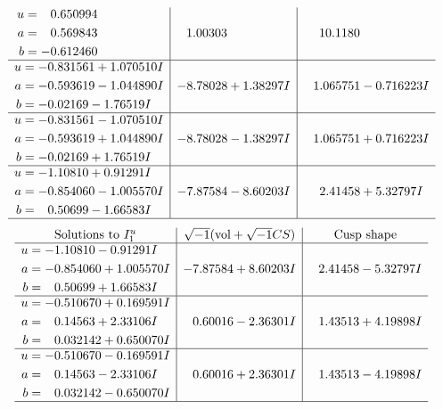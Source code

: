 \documentclass[1p]{elsarticle_modified}
\theoremstyle{definition}
\newcommand{\I}{\sqrt{-1}}
\begin{document}
$$\begin{array}{c|c|c}
\begin{aligned}
u &= \phantom{-}0.650994\phantom{ +0.000000I} \\
a &= \phantom{-}0.569843\phantom{ +0.000000I} \\
b &= -0.612460\phantom{ +0.000000I}\end{aligned}
 & \phantom{-}1.00303\phantom{ +0.000000I} & \phantom{-}10.1180\phantom{ +0.000000I} \\ \hline\begin{aligned}
u &= -0.831561 + 1.070510 I \\
a &= -0.593619 - 1.044890 I \\
b &= -0.02169 - 1.76519 I\end{aligned}
 & -8.78028 + 1.38297 I & \phantom{-}1.065751 - 0.716223 I \\ \hline\begin{aligned}
u &= -0.831561 - 1.070510 I \\
a &= -0.593619 + 1.044890 I \\
b &= -0.02169 + 1.76519 I\end{aligned}
 & -8.78028 - 1.38297 I & \phantom{-}1.065751 + 0.716223 I \\ \hline\begin{aligned}
u &= -1.10810 + 0.91291 I \\
a &= -0.854060 - 1.005570 I \\
b &= \phantom{-}0.50699 - 1.66583 I\end{aligned}
 & -7.87584 - 8.60203 I & \phantom{-}2.41458 + 5.32797 I\\
 \hline 
 \end{array}$$\newpage$$\begin{array}{c|c|c}  
\text{Solutions to }I^u_{1}& \I (\text{vol} + \sqrt{-1}CS) & \text{Cusp shape}\\
 \hline 
\begin{aligned}
u &= -1.10810 - 0.91291 I \\
a &= -0.854060 + 1.005570 I \\
b &= \phantom{-}0.50699 + 1.66583 I\end{aligned}
 & -7.87584 + 8.60203 I & \phantom{-}2.41458 - 5.32797 I \\ \hline\begin{aligned}
u &= -0.510670 + 0.169591 I \\
a &= \phantom{-}0.14563 + 2.33106 I \\
b &= \phantom{-}0.032142 + 0.650070 I\end{aligned}
 & \phantom{-}0.60016 - 2.36301 I & \phantom{-}1.43513 + 4.19898 I \\ \hline\begin{aligned}
u &= -0.510670 - 0.169591 I \\
a &= \phantom{-}0.14563 - 2.33106 I \\
b &= \phantom{-}0.032142 - 0.650070 I\end{aligned}
 & \phantom{-}0.60016 + 2.36301 I & \phantom{-}1.43513 - 4.19898 I\\
 \hline 
 \end{array}$$\newpage\newpage\renewcommand{\arraystretch}{1}
\end{document}
